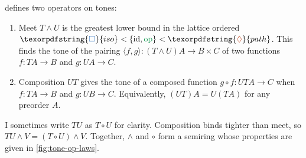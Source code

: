 \documentclass{rntz}
\newcommand\opcolor{\color{ForestGreen}}
\newcommand\isocolor{\color{NavyBlue}}
\newcommand\pathcolor{\color{Bittersweet}}
\newcommand\id{\ensuremath{\mathrm{id}}}
\newcommand\op{\ensuremath{\mathrm{\opcolor op}}}
\newcommand\iso{\texorpdfstring{\ensuremath{{\isocolor\Box}}}{iso}}
\renewcommand\path{\texorpdfstring{\ensuremath{{\pathcolor\lozenge}}}{path}}
\newcommand\tc{\circ}                      %
\newcommand\tmeet{\wedge}                  %
\begin{document}
 defines two operators on tones:
\begin{enumerate}
\item Meet $T \tmeet U$ is the greatest lower bound in the lattice ordered $\iso
  < \{\id, \op\} < \path$. This finds the tone of the pairing $\langle f, g\rangle
  : (T \tmeet U)A \to B \times C$ of two functions $f : TA \to B$ and $g : UA
  \to C$.

\item Composition $UT$ gives the tone of a composed function $g \circ f : UTA
  \to C$ when $f : TA \to B$ and $g : UB \to C$. Equivalently, $(UT)A = U(TA)$
  for any preorder $A$.
\end{enumerate}

I sometimes write $TU$ as $T \tc U$ for clarity. Composition binds tighter than
meet, so $TU \tmeet V = (T \circ U) \tmeet V$.
%
Together, $\tmeet$ and $\tc$ form a semiring whose properties are given in
\cref{fig:tone-op-laws}.

\end{document}
